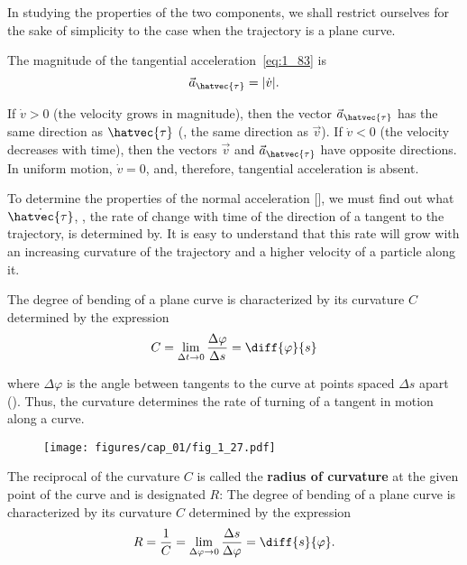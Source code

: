 In studying the properties of the two components, we shall restrict ourselves for the sake of simplicity to the case when the trajectory is a plane curve.

The magnitude of the tangential acceleration~\eqref{eq:1_83} is
\begin{equation}\label{eq:1_85}
\vec{a}_{\hatvec{\tau}} = |\dot{v}|.
\end{equation}

\noindent
If $\dot{v}>0$ (the velocity grows in magnitude), then the vector $\vec{a}_{\hatvec{\tau}}$ has the same direction as $\hatvec{\tau}$ (\ie, the same direction as $\vec{v}$). If $\dot{v}<0$ (the velocity decreases with time), then the vectors $\vec{v}$ and $\vec{a}_{\hatvec{\tau}}$ have opposite directions. In uniform motion, $\dot{v}=0$, and, therefore, tangential acceleration is absent.

To determine the properties of the normal acceleration [], we must find out what $\dot{\hatvec{\tau}}$, \ie, the rate of change with time of the direction of a tangent to the trajectory, is determined by. It is easy to understand that this rate will grow with an increasing curvature of the trajectory and a higher velocity of a particle along it. 

The degree of bending of a plane curve is characterized by its curvature $C$ determined by the expression
\begin{equation}\label{eq:1_86}
C = \lim_{\Delta t\to 0} \frac{\Delta\varphi}{\Delta s} = \diff{\varphi}{s}
\end{equation}

\noindent
where $\Delta\varphi$ is the angle between tangents to the curve at points spaced $\Delta s$ apart (). Thus, the curvature determines the rate of turning of a tangent in motion along a curve.

\begin{figure}[t]
	\begin{center}
		\texttt{[image: figures/cap\_01/fig\_1\_27.pdf]}
		\caption[]{}
		\label{fig:1_27}
	\end{center}
	\vspace{-0.7cm}
\end{figure}


The reciprocal of the curvature $C$ is called the \textbf{radius of curvature} at the given point of the curve and is designated $R$:
The degree of bending of a plane curve is characterized by its curvature $C$ determined by the expression
\begin{equation}\label{eq:1_87}
R = \frac{1}{C} = \lim_{\Delta\varphi\to 0} \frac{\Delta s}{\Delta\varphi} = \diff{s}{\varphi}.
\end{equation}

